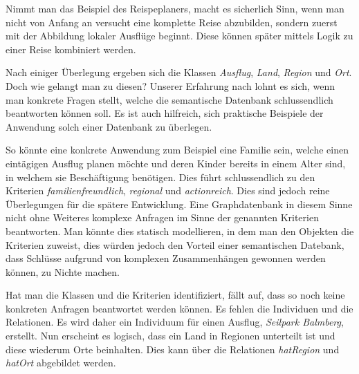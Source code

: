 Nimmt man das Beispiel des Reispeplaners, macht es sicherlich Sinn, wenn man nicht von Anfang an versucht eine komplette Reise abzubilden, sondern zuerst mit der Abbildung lokaler Ausflüge beginnt. Diese können später mittels Logik zu einer Reise kombiniert werden.

Nach einiger Überlegung ergeben sich die Klassen \textit{Ausflug}, \textit{Land}, \textit{Region} und \textit{Ort}. Doch wie gelangt man zu diesen? Unserer Erfahrung nach lohnt es sich, wenn man konkrete Fragen stellt, welche die semantische Datenbank schlussendlich beantworten können soll. Es ist auch hilfreich, sich praktische Beispiele der Anwendung solch einer Datenbank zu überlegen.

So könnte eine konkrete Anwendung zum Beispiel eine Familie sein, welche einen eintägigen Ausflug planen möchte und deren Kinder bereits in einem Alter sind, in welchem sie Beschäftigung benötigen. Dies führt schlussendlich zu den Kriterien \textit{familienfreundlich}, \textit{regional} und \textit{actionreich}. Dies sind jedoch reine Überlegungen für die spätere Entwicklung. Eine Graphdatenbank in diesem Sinne nicht ohne Weiteres komplexe Anfragen im Sinne der genannten Kriterien beantworten. Man könnte dies statisch modellieren, in dem man den Objekten die Kriterien zuweist, dies würden jedoch den Vorteil einer semantischen Datebank, dass Schlüsse aufgrund von komplexen Zusammenhängen gewonnen werden können, zu Nichte machen.

Hat man die Klassen und die Kriterien identifiziert, fällt auf, dass so noch keine konkreten Anfragen beantwortet werden können. Es fehlen die Individuen und die Relationen. Es wird daher ein Individuum für einen Ausflug, \textit{Seilpark Balmberg}, erstellt. Nun erscheint es logisch, dass ein Land in Regionen unterteilt ist und diese wiederum Orte beinhalten. Dies kann über die Relationen \textit{hatRegion} und \textit{hatOrt} abgebildet werden.

